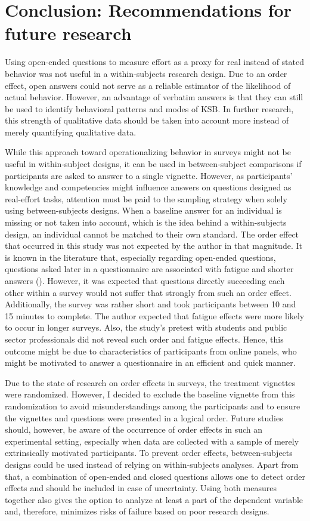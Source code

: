 \documentclass[twocolumn, issue, empirical, authordate]{jote-new-article}
\begin{document}
\section{Conclusion: Recommendations for future research}

Using open-ended questions to measure effort as a proxy for real instead of stated behavior was not useful in a within-subjects research design.
Due to an order effect, open answers could not serve as a reliable estimator of the likelihood of actual behavior. However, an advantage of verbatim answers is that they can still be used to identify behavioral patterns and modes of KSB. In further research, this strength of qualitative data should be taken into account more instead of merely quantifying qualitative data.

While this approach toward operationalizing behavior in surveys might not be useful in within-subject designs, it can be used in between-subject comparisons if participants are asked to answer to a single vignette. However, as participants' knowledge and competencies might influence answers on questions designed as real-effort tasks, attention must be paid to the sampling strategy when solely using between-subjects designs. When a baseline answer for an individual is missing or not taken into account, which is the idea behind a within-subjects design, an individual cannot be matched to their own standard. The order effect that occurred in this study was not expected by the author in that magnitude. It is known in the literature that, especially regarding open-ended questions, questions asked later in a questionnaire are associated with fatigue and shorter answers (). However, it was expected that questions directly succeeding each other within a survey would not suffer that strongly from such an order effect. Additionally, the survey was rather short and took participants between 10 and 15 minutes to complete. The author expected that fatigue effects were more likely to occur in longer surveys. Also, the study's pretest with students and public sector professionals did not reveal such order and fatigue effects. Hence, this outcome might be due to characteristics of participants from online panels, who might be motivated to answer a questionnaire in an efficient and quick manner.

Due to the state of research on order effects in surveys, the treatment vignettes were randomized. However, I decided to exclude the baseline vignette from this randomization to avoid misunderstandings among the participants and to ensure the vignettes and questions were presented in a logical order. Future studies should, however, be aware of the occurrence of order effects in such an experimental setting, especially when data are collected with a sample of merely extrinsically motivated participants. To prevent order effects, between-subjects designs could be used instead of relying on within-subjects analyses. Apart from that, a combination of open-ended and closed questions allows one to detect order effects and should be included in case of uncertainty. Using both measures together also gives the option to analyze at least a part of the dependent variable and, therefore, minimizes risks of failure based on poor research designs.
\end{document}
